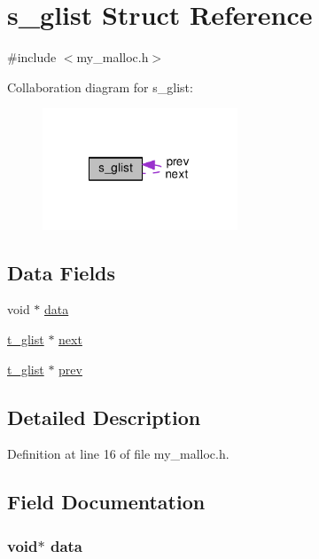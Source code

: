 \hypertarget{structs__glist}{\section{s\-\_\-glist Struct Reference}
\label{structs__glist}
}


{\ttfamily \#include $<$my\-\_\-malloc.\-h$>$}



Collaboration diagram for s\-\_\-glist\-:\nopagebreak
\begin{figure}[H]
\begin{center}
\leavevmode
\includegraphics[width=165pt]{da/d3f/structs__glist__coll__graph}
\end{center}
\end{figure}
\subsection*{Data Fields}
\begin{DoxyCompactItemize}
\item 
void $\ast$ \hyperlink{structs__glist_a735984d41155bc1032e09bece8f8d66d}{data}
\item 
\hyperlink{my__malloc_8h_abf4de9540ebf53a5ae570cdbf226dab7}{t\-\_\-glist} $\ast$ \hyperlink{structs__glist_a20c22490f3a95677fd45a335958ea5da}{next}
\item 
\hyperlink{my__malloc_8h_abf4de9540ebf53a5ae570cdbf226dab7}{t\-\_\-glist} $\ast$ \hyperlink{structs__glist_a3d44f907f8e9a16abd22ce7aa098a912}{prev}
\end{DoxyCompactItemize}


\subsection{Detailed Description}


Definition at line 16 of file my\-\_\-malloc.\-h.



\subsection{Field Documentation}
\hypertarget{structs__glist_a735984d41155bc1032e09bece8f8d66d}{
\subsubsection[{data}]{\setlength{\rightskip}{0pt plus 5cm}void$\ast$ data}}\label{structs__glist_a735984d41155bc1032e09bece8f8d66d}


